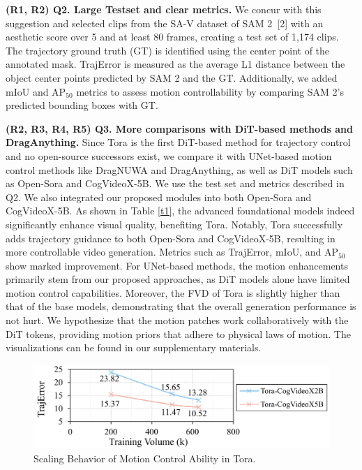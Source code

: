 \documentclass[10pt,twocolumn,letterpaper]{article}
\begin{document}
\noindent \textbf{(R1, R2) Q2. Large Testset and clear metrics.} We concur with this suggestion and selected clips from the SA-V dataset of SAM 2~[2] with an aesthetic score over 5 and at least 80 frames, creating a test set of 1,174 clips. The trajectory ground truth (GT) is identified using the center point of the annotated mask. TrajError is measured as the average L1 distance between the object center points predicted by SAM 2 and the GT. Additionally, we added mIoU and AP$_{50}$ metrics to assess motion controllability by comparing SAM 2's predicted bounding boxes with GT.


\noindent \textbf{(R2, R3, R4, R5) Q3. More comparisons with DiT-based methods and DragAnything.} Since Tora is the first DiT-based method for trajectory control and no open-source successors exist, we compare it with UNet-based motion control methods like DragNUWA and DragAnything, as well as DiT models such as Open-Sora and CogVideoX-5B. We use the test set and metrics described in Q2. We also integrated our proposed modules into both Open-Sora and CogVideoX-5B. As shown in Table \ref{t1}, the advanced foundational models indeed significantly enhance visual quality, benefiting Tora. Notably, Tora successfully adds trajectory guidance to both Open-Sora and CogVideoX-5B, resulting in more controllable video generation. Metrics such as TrajError, mIoU, and AP$_{50}$ show marked improvement. For UNet-based methods, the motion enhancements primarily stem from our proposed approaches, as DiT models alone have limited motion control capabilities. Moreover, the FVD of Tora is slightly higher than that of the base models, demonstrating that the overall generation performance is not hurt. We hypothesize that the motion patches work collaboratively with the DiT tokens, providing motion priors that adhere to physical laws of motion. The visualizations can be found in our supplementary materials.

\begin{figure}[!t]
    \centering
    \includegraphics[width=1\linewidth]{images/reb-f1.pdf}
    \caption{Scaling Behavior of Motion Control Ability in Tora.}
    \label{f1}
    \vspace{-3mm}
\end{figure}
\end{document}
